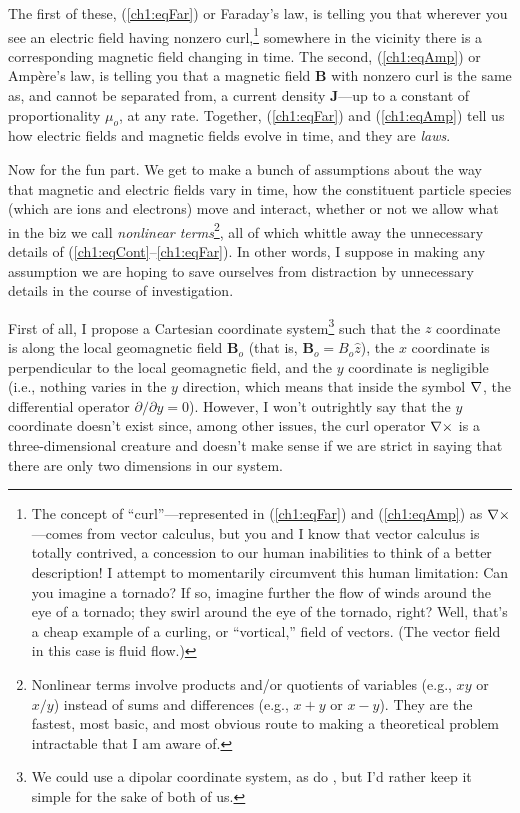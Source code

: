 The first of these, (\ref{ch1:eqFar}) or Faraday's law, is telling you that
wherever you see an electric field having nonzero curl,\footnote{The concept of
  ``curl''---represented in (\ref{ch1:eqFar}) and (\ref{ch1:eqAmp}) as ${\bf \nabla}
  \times$---comes from vector calculus, but you and I know that vector calculus
  is totally contrived, a concession to our human inabilities to think of a
  better description! I attempt to momentarily circumvent this human limitation:
  Can you imagine a tornado? If so, imagine further the flow of winds around the
  eye of a tornado; they swirl around the eye of the tornado, right? Well,
  that's a cheap example of a curling, or ``vortical,'' field of vectors. (The
  vector field in this case is fluid flow.) } somewhere in the vicinity there is
a corresponding magnetic field changing in time. The second, (\ref{ch1:eqAmp})
or Amp\`{e}re's law, is telling you that a magnetic field $\mathbf{B}$ with
nonzero curl is the same as, and cannot be separated from, a current density
$\mathbf{J}$---up to a constant of proportionality $\mu_o$, at any
rate. Together, (\ref{ch1:eqFar}) and (\ref{ch1:eqAmp}) tell us how electric
fields and magnetic fields evolve in time, and they are \emph{laws}. 

Now for the fun part. We get to make a bunch of assumptions about the way that
magnetic and electric fields vary in time, how the constituent particle species
(which are ions and electrons) move and interact, whether or not we allow what
in the biz we call \emph{nonlinear terms}\footnote{Nonlinear terms involve
  products and/or quotients of variables (e.g., $xy$ or $x/y$) instead of sums
  and differences (e.g., $x+y$ or $x-y$). They are the fastest, most basic, and
  most obvious route to making a theoretical problem intractable that I am aware
  of.}, all of which whittle away the unnecessary details of
(\ref{ch1:eqCont}--\ref{ch1:eqFar}). In other words, I suppose in making any
assumption we are hoping to save ourselves from distraction by unnecessary
details in the course of investigation.

First of all, I propose a Cartesian coordinate system\footnote{We could use a
  dipolar coordinate system, as do \citet{Lysak2013}, but I'd rather keep it
  simple for the sake of both of us.} such that the $z$ coordinate is along the
local geomagnetic field $\mathbf{B}_o$ (that is, $\mathbf{B}_o = B_o \hat{z}$),
the $x$ coordinate is perpendicular to the local geomagnetic field, and the $y$
coordinate is negligible (i.e., nothing varies in the $y$ direction, which means
that inside the symbol ${\bf \nabla}$, the differential operator $\partial / \partial y
= 0$). However, I won't outrightly say that the $y$ coordinate doesn't exist
since, among other issues, the curl operator ${\bf \nabla} \times$ is a
three-dimensional creature and doesn't make sense if we are strict in saying
that there are only two dimensions in our system.

